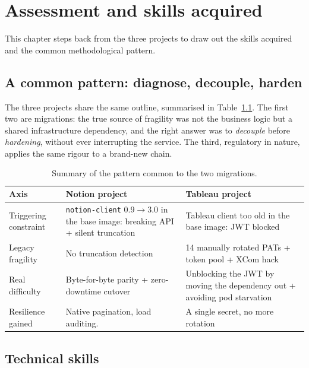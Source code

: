 \chapter{Assessment and skills acquired}\label{ch:assessment}

This chapter steps back from the three projects to draw out the skills acquired and the common methodological pattern.

\section{A common pattern: diagnose, decouple, harden}

The three projects share the same outline, summarised in Table~\ref{tab:synthesis}. The first two are migrations: the true source of fragility was not the business logic but a shared infrastructure dependency, and the right answer was to \emph{decouple} before \emph{hardening}, without ever interrupting the service. The third, regulatory in nature, applies the same rigour to a brand-new chain.

\begin{table}[H]
\centering\small
\renewcommand{\arraystretch}{1.35}
\begin{tabularx}{\textwidth}{@{}p{2.6cm}XX@{}}
\toprule
\textbf{Axis} & \textbf{Notion project} & \textbf{Tableau project} \\
\midrule
Triggering constraint & \texttt{notion-client} 0.9$\rightarrow$3.0 in the base image: breaking API + silent truncation & Tableau client too old in the base image: JWT blocked \\
Legacy fragility & No truncation detection & 14 manually rotated PATs + token pool + XCom hack \\
Real difficulty & Byte-for-byte parity + zero-downtime cutover & Unblocking the JWT by moving the dependency out + avoiding pod starvation \\
Resilience gained & Native pagination, load auditing. & A single secret, no more rotation \\
\bottomrule
\end{tabularx}
\caption{Summary of the pattern common to the two migrations.}
\label{tab:synthesis}
\end{table}

\section{Technical skills}


